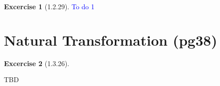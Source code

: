 \documentclass{article}
\theoremstyle{definition}
\newtheorem*{excercise}{Excercise}
\begin{document}
\begin{excercise}[1.2.29] %
		\item \textcolor{blue}{To do 1}
\end{excercise}

\section{Natural Transformation (pg38)}

\begin{excercise}[1.3.26] %

\end{excercise}




\pagebreak
TBD
\end{document}
